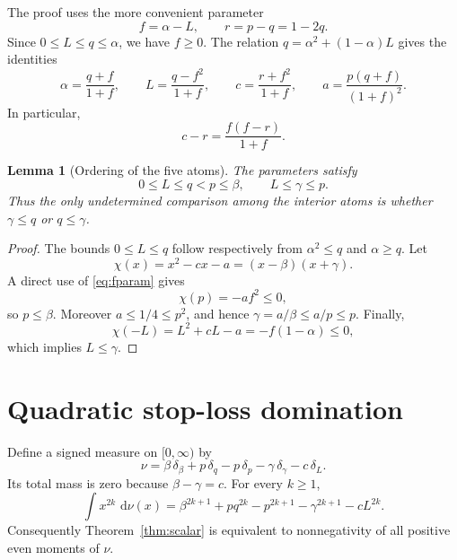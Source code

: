\documentclass[11pt]{article}
\newtheorem{lemma}[theorem]{Lemma}
\theoremstyle{remark}
\newcommand{\dd}{\,\mathrm d}
\begin{document}
The proof uses the more convenient parameter
\begin{equation}\label{eq:fdef}
 f=\alpha-L,
 \qquad r=p-q=1-2q.
\end{equation}
Since $0\le L\le q\le\alpha$, we have $f\ge0$.  The relation
$q=\alpha^2+(1-\alpha)L$ gives the identities
\begin{equation}\label{eq:fparam}
 \alpha=\frac{q+f}{1+f},\qquad
 L=\frac{q-f^2}{1+f},\qquad
 c=\frac{r+f^2}{1+f},\qquad
 a=\frac{p(q+f)}{(1+f)^2}.
\end{equation}
In particular,
\begin{equation}\label{eq:cminus-r}
 c-r=\frac{f(f-r)}{1+f}.
\end{equation}

\begin{lemma}[Ordering of the five atoms]\label{lem:order}
The parameters satisfy
\begin{equation}\label{eq:order}
 0\le L\le q<p\le\beta,
 \qquad L\le\gamma\le p.
\end{equation}
Thus the only undetermined comparison among the interior atoms is whether
$\gamma\le q$ or $q\le\gamma$.
\end{lemma}

\begin{proof}
The bounds $0\le L\le q$ follow respectively from
$\alpha^2\le q$ and $\alpha\ge q$.  Let
\[
 \chi(x)=x^2-cx-a=(x-\beta)(x+\gamma).
\]
A direct use of \eqref{eq:fparam} gives
\begin{equation}\label{eq:chip}
 \chi(p)=-af^2\le0,
\end{equation}
so $p\le\beta$.  Moreover $a\le1/4\le p^2$, and hence
$\gamma=a/\beta\le a/p\le p$.  Finally,
\begin{equation}\label{eq:chiL}
 \chi(-L)=L^2+cL-a=-f(1-\alpha)\le0,
\end{equation}
which implies $L\le\gamma$.
\end{proof}

\section{Quadratic stop-loss domination}\label{sec:proof}

Define a signed measure on $[0,\infty)$ by
\begin{equation}\label{eq:measure}
 \nu=
 \beta\,\delta_\beta+p\,\delta_q-p\,\delta_p
 -\gamma\,\delta_\gamma-c\,\delta_L.
\end{equation}
Its total mass is zero because $\beta-\gamma=c$.  For every $k\ge1$,
\begin{equation}\label{eq:moment-is-goal}
 \int x^{2k}\,\dd\nu(x)
 =\beta^{2k+1}+pq^{2k}-p^{2k+1}
  -\gamma^{2k+1}-cL^{2k}.
\end{equation}
Consequently Theorem~\ref{thm:scalar} is equivalent to nonnegativity of all
positive even moments of $\nu$.
\end{document}
